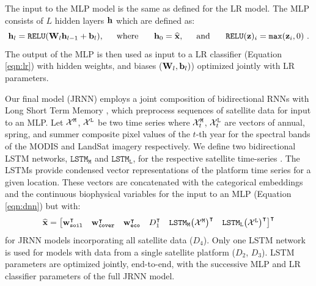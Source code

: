 \documentclass{article} %
\begin{document}
The input to the MLP model is the same as defined for the LR model. 
The MLP consists of $L$ hidden layers ${\bf h}$ which are defined as:
\begin{equation}\label{eqn:dnn}
{\bf h}_l = \texttt{RELU}({\bf W}_l {\bf h}_{l-1} + {\bf b}_l), \hspace{15pt} \textrm{where } \hspace{15pt}
{\bf h}_0=\widehat{{\bf x}}, \hspace{15pt} \textrm{and }\hspace{15pt}
\texttt{RELU}({\bf z})_i = \texttt{max}({\bf z}_i, 0) \textrm{ .}
\end{equation}
The output of the MLP is then used as input to a LR classifier (Equation \ref{eqn:lr}) with hidden weights, and biases (${\bf W}_l,   {\bf b}_l)$) optimized jointly with LR parameters.

Our final model (JRNN) employs a joint composition of bidirectional RNNs \citep{schuster1997bidirectional} with Long Short Term Memory \citep{hochreiter1997long}, which preprocess sequences of satellite data for input to an MLP. 
Let ${\bf \mathcal{X}}^{\texttt{M}}$, ${\bf \mathcal{X}}^{\texttt{L}}$ be two time series where ${\bf \mathcal{X}}^{\texttt{M}}_{t}$, ${\bf \mathcal{X}}^{\texttt{L}}_{t}$ are vectors of annual, spring, and summer composite pixel values of the $t$-th year for the spectral bands of the MODIS and LandSat imagery respectively. 
We define two bidirectional LSTM networks, $\texttt{LSTM}_{\texttt{M}}$ and $\texttt{LSTM}_{\texttt{L}}$, for the respective satellite time-series . 
The LSTMs provide condensed vector representations of the platform time series for a given location. 
These vectors are concatenated with the categorical embeddings and the continuous biophysical variables 
for the input to an MLP (Equation \ref{eqn:dnn}) but with:
\begin{equation}
\widehat{{\bf x}} = \begin{bmatrix}{\bf w}_{\texttt{soil}}^{\intercal}&{\bf w}_{\texttt{cover}}^{\intercal}&{\bf w}_{\texttt{eco}}^{\intercal}&D_1^{\intercal}  &\texttt{LSTM}_{\texttt{M}}\bigl(\mathcal{X}^{\texttt{M}}\bigr)^{\intercal}&\texttt{LSTM}_{\texttt{L}}\bigl(\mathcal{X}^{\texttt{L}}\bigr)^{\intercal}\end{bmatrix}^{\intercal}
\end{equation}
for JRNN models incorporating all satellite data ($D_4$). Only one LSTM network is used for models with data from a single satellite platform ($D_2$, $D_3$). LSTM parameters are optimized jointly, end-to-end, with the successive MLP and LR classifier parameters of the full JRNN model. 
\end{document}
